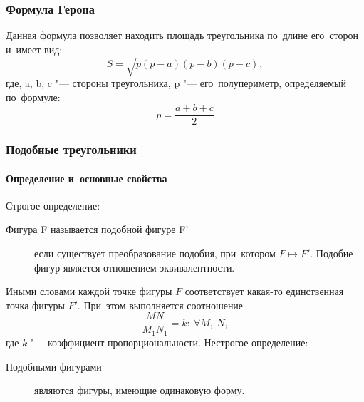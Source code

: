 \documentclass[]{scrartcl}
\begin{document}
\subsubsection{Формула Герона}
Данная формула позволяет находить площадь треугольника по~длине его~сторон и~имеет вид:
\begin{equation}\label{eq:formula-geron}
S=\sqrt{p(p-a)(p-b)(p-c)},
\end{equation}
где, a, b, c "--- стороны треугольника, p "--- его~полупериметр, определяемый по~формуле:
\begin{equation}\label{eq:half-perimeter}
p=\frac{a+b+c}{2}
\end{equation}

\subsubsection{Подобные треугольники}
\paragraph{Определение и~основные свойства}
Строгое определение:
\begin{description}
	\item[Фигура F называется подобной фигуре F'] если существует преобразование подобия, при~котором ${\textstyle F \mapsto F'}$. Подобие фигур является отношением эквивалентности.
\end{description}
Иными словами каждой точке фигуры $\textstyle F$ соответствует какая-то единственная точка фигуры $\textstyle F'$. При~этом выполняется соотношение
\begin{equation}\label{eq:similar-figures-1}
\frac{MN}{M_{1}N_{1}}=k:\ \forall M,\ N,
\end{equation}
где $\textstyle k$ "--- коэффициент пропорциональности.
Нестрогое определение:
\begin{description}
	\item[Подобными фигурами] являются фигуры, имеющие одинаковую форму. 
\end{description}
\end{document}
